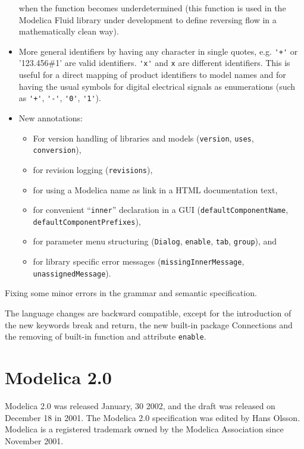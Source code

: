 \begin{itemize}
  when the function becomes underdetermined (this function is used in
  the Modelica Fluid library under development to define reversing flow
  in a mathematically clean way).
\item
  More general identifiers by having any character in single quotes,
  e.g. \lstinline!'+'! or '123.456\#1' are valid identifiers. \lstinline!'x'! and \lstinline!x! are
  different identifiers. This is useful for a direct mapping of product
  identifiers to model names and for having the usual symbols for
  digital electrical signals as enumerations (such as \lstinline!'+'!, \lstinline!'-'!, \lstinline!'0'!,
  \lstinline!'1'!).
\item
  New annotations:
\begin{itemize}
\item For version handling of libraries and models (\lstinline!version!, \lstinline!uses!,
\lstinline!conversion!),
\item for revision logging (\lstinline!revisions!),
\item for using a Modelica name as link in a HTML documentation text,
\item for convenient ``\lstinline!inner!'' declaration in a GUI (\lstinline!defaultComponentName!,
\lstinline!defaultComponentPrefixes!),
\item for parameter menu structuring (\lstinline!Dialog!, \lstinline!enable!, \lstinline!tab!,
\lstinline!group!), and
\item for library specific error messages (\lstinline!missingInnerMessage!,
\lstinline!unassignedMessage!).
\end{itemize}
\end{itemize}
Fixing some minor errors in the grammar and semantic specification.

The language changes are backward compatible, except for the
introduction of the new keywords break and return, the new built-in
package Connections and the removing of built-in function and attribute
\lstinline!enable!.

\section{Modelica 2.0}

Modelica 2.0 was released January, 30 2002, and the draft was released
on December 18 in 2001. The Modelica 2.0 specification was edited by
Hans Olsson. Modelica is a registered trademark owned by the Modelica
Association since November 2001.

